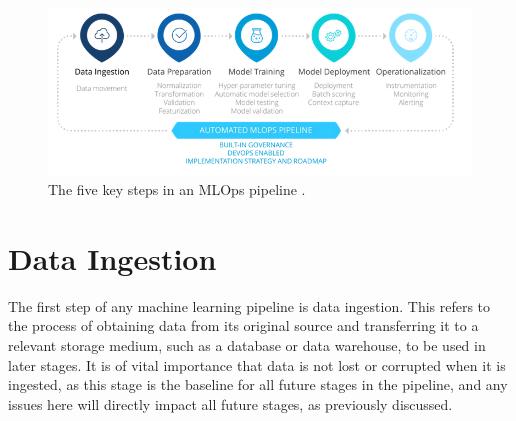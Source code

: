 \documentclass[12pt]{report}
\begin{document}





\begin{figure}[H]
    \centering
    \includegraphics[width=.75\linewidth]{MLPipeline.png}
    \caption{The five key steps in an MLOps pipeline \autocite{incycle_software_mlops_nodate}.}
    \label{fig:MLPipeline}
\end{figure}

\section{Data Ingestion}
The first step of any machine learning pipeline is data ingestion. This refers to the process of obtaining data from its original source
and transferring it to a relevant storage medium, such as a database or data warehouse, to be used in later stages. 
It is of vital importance that data is not lost or corrupted when it is ingested, as this stage is the baseline for all future stages in the pipeline, and any issues
here will directly impact all future stages, as previously discussed. 
\end{document}
